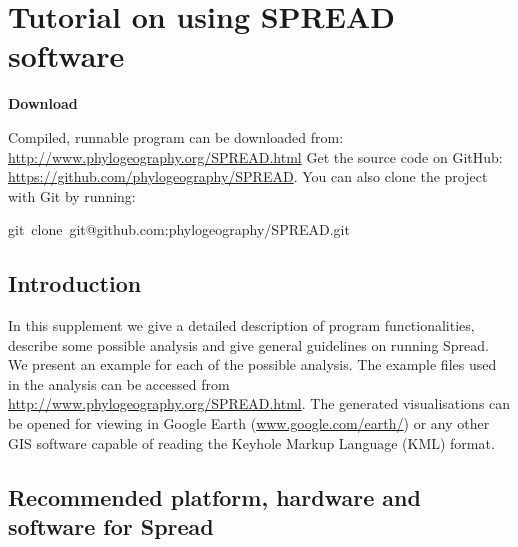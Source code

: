 \chapter{Tutorial on using SPREAD software}

% 

\begin{flushleft}
\textbf{Download}
\par\end{flushleft}
Compiled, runnable program can be downloaded from: \url{http://www.phylogeography.org/SPREAD.html}
Get the source code on GitHub: \url{https://github.com/phylogeography/SPREAD}.
You can also clone the project with Git by running:

\begin{lyxcode}
git~clone~git@github.com:phylogeography/SPREAD.git
\end{lyxcode}

\section{Introduction}

In this supplement we give a detailed description of program functionalities, describe some possible analysis and give general guidelines on running Spread. 
We present an example for each of the possible analysis. 
The example files used in the analysis can be accessed from \url{http://www.phylogeography.org/SPREAD.html}.
The generated visualisations can be opened for viewing in Google Earth (\url{www.google.com/earth/}) or any other GIS software capable of reading the Keyhole Markup Language (KML) format.


\section{Recommended platform, hardware and software for Spread}

